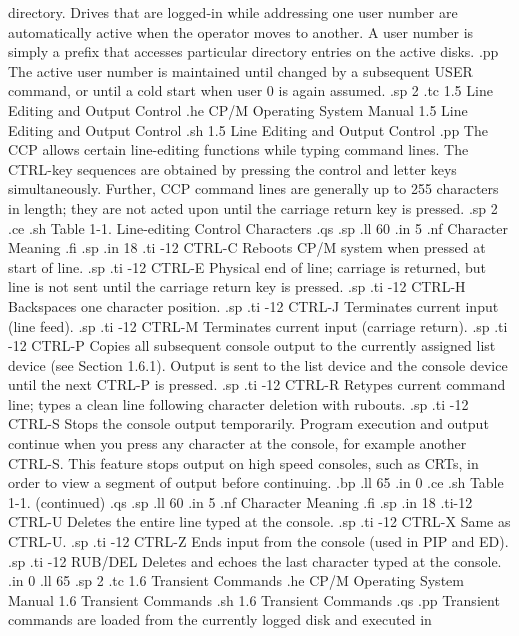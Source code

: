 directory.  Drives that are logged-in while addressing one user number are 
automatically active when the operator moves to another.  A user number is 
simply a prefix that accesses particular directory entries on the active 
disks.
.pp
The active user number is maintained until changed by a subsequent USER 
command, or until a cold start when user 0 is again assumed.
.sp 2
.tc    1.5  Line Editing and Output Control
.he CP/M Operating System Manual 1.5  Line Editing and Output Control
.sh
1.5  Line Editing and Output Control
.pp
The CCP allows certain line-editing functions while typing command lines.  
The CTRL-key sequences are obtained by pressing the control and letter keys 
simultaneously.  Further, CCP command lines are generally up to 255 
characters in length; they are not acted upon until the carriage return key 
is pressed.
.sp 2
.ce
.sh
Table 1-1.  Line-editing Control Characters
.qs
.sp
.ll 60
.in 5
.nf
Character                      Meaning
.fi
.sp
.in 18
.ti -12
CTRL-C      Reboots CP/M system when pressed at start of line.
.sp
.ti -12
CTRL-E      Physical end of line; carriage is returned, but line is not sent 
until the carriage return key is pressed.
.sp 
.ti -12
CTRL-H      Backspaces one character position.
.sp
.ti -12
CTRL-J      Terminates current input (line feed).
.sp
.ti -12
CTRL-M      Terminates current input (carriage return).
.sp
.ti -12
CTRL-P      Copies all subsequent console output to the currently 
assigned list device (see Section 1.6.1).  Output is sent to the list device 
and the console device until the next CTRL-P is pressed.
.sp
.ti -12
CTRL-R      Retypes current command line; types a clean line following 
character deletion with rubouts.
.sp
.ti -12
CTRL-S      Stops the console output temporarily.  Program execution and 
output continue when you press any character at the console, for 
example another CTRL-S.  This feature stops output on high speed consoles, 
such as CRTs, in order to view a segment of output before continuing.
.bp
.ll 65
.in 0
.ce
.sh
Table 1-1.  (continued)
.qs
.sp
.ll 60
.in 5
.nf
Character                      Meaning
.fi
.sp
.in 18
.ti-12
CTRL-U      Deletes the entire line typed at the console.
.sp
.ti -12
CTRL-X      Same as CTRL-U.
.sp
.ti -12
CTRL-Z      Ends input from the console (used in PIP and ED).
.sp
.ti -12
RUB/DEL     Deletes and echoes the last character typed at the console.
.in 0
.ll 65
.sp 2
.tc    1.6  Transient Commands
.he CP/M Operating System Manual              1.6  Transient Commands
.sh
1.6  Transient Commands
.qs
.pp
Transient commands are loaded from the currently logged disk and executed in 
